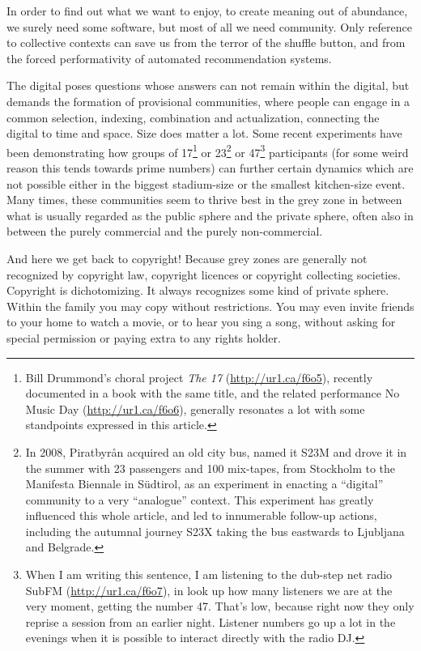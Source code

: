 In order to f\hbox{}ind out what we want to enjoy, to create meaning out of
abundance, we surely need some software, but most of all we need community. Only
reference to collective contexts can save us from the terror of the
shuf\hbox{}f\hbox{}le button, and from the forced performativity of automated
recommendation systems.

The digital poses questions whose answers can not remain within the digital, but
demands the formation of provisional communities, where people can engage in a
common selection, indexing, combination and actualization, connecting the
digital to time and space. Size does matter a lot. Some recent experiments have
been demonstrating how groups of 17\footnote{Bill Drummond's choral project
\textit{The 17} (\url{http://ur1.ca/f6o5}), recently documented in a book with
the same title, and the related performance No Music Day
(\url{http://ur1.ca/f6o6}), generally resonates a lot with some standpoints
expressed in this article.} or 23\footnote{In 2008, Piratbyrån acquired an old
city bus, named it S23M and drove it in the summer with 23 passengers and 100
mix-tapes, from Stockholm to the Manifesta Biennale in Südtirol, as an
experiment in enacting a ``digital'' community to a very ``analogue'' context.
This experiment has greatly inf\hbox{}luenced this whole article, and led to
innumerable follow-up actions, including the autumnal journey S23X taking the
bus eastwards to Ljubljana and Belgrade.} or 47\footnote{When I am writing this
sentence, I am listening to the dub-step net radio SubFM
(\url{http://ur1.ca/f6o7}), in look up how many listeners we are at the very
moment, getting the number 47. That's low, because right now they only reprise a
session from an earlier night. Listener numbers go up a lot in the evenings when
it is possible to interact directly with the radio DJ.} participants (for some
weird reason this tends towards prime numbers) can further certain dynamics
which are not possible either in the biggest stadium-size or the smallest
kitchen-size event. Many times, these communities seem to thrive best in the
grey zone in between what is usually regarded as the public sphere and the
private sphere, often also in between the purely commercial and the purely
non-commercial.

And here we get back to copyright! Because grey zones are generally not
recognized by copyright law, copyright licences or copyright collecting
societies. Copyright is dichotomizing. It always recognizes some kind of private
sphere. Within the family you may copy without restrictions. You may even invite
friends to your home to watch a movie, or to hear you sing a song, without
asking for special permission or paying extra to any rights holder.

